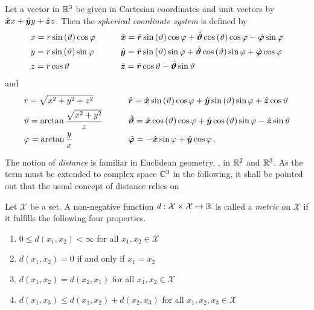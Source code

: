 \begin{definition}
	\label{def:sph_coords}
	Let a vector in $\mathbb{R}^3$ be given in Cartesian coordinates and unit vectors
	by $\uv{x}x + \uv{y}y + \uv{z}z$.
	Then the \emph{spherical coordinate system} is defined by 
	\begin{subequations}
		\begin{align}
			&x = r \sin \left(\vartheta\right) \cos \varphi
			\qquad
			&&\uv{x} = \uv{r} \sin\left(\vartheta\right) \cos \varphi +
			\uv{\vartheta} \cos\left(\vartheta\right) \cos \varphi -
			\uv{\varphi} \sin \varphi \\
			&y = r \sin \left(\vartheta\right) \sin \varphi
			\qquad
			&&\uv{y} = \uv{r} \sin\left(\vartheta\right) \sin \varphi +
			\uv{\vartheta} \cos\left(\vartheta\right) \sin \varphi +
			\uv{\varphi} \cos \varphi \\
			&z = r \cos \vartheta
			\qquad
			&&\uv{z} = \uv{r} \cos \vartheta - \uv{\vartheta} \sin \vartheta
		\end{align}
	\end{subequations}
	and
	\begin{subequations}
		\begin{align}
			&r = \sqrt{x^2 + y^2 + z^2}
			\qquad
			&&\uv{r} =
			\uv{x} \sin \left(\vartheta\right) \cos \varphi +
			\uv{y} \sin \left(\vartheta\right) \sin \varphi +
			\uv{z} \cos \vartheta \\
			&\vartheta = \arctan \frac{\sqrt{x^2 + y^2}}{z}
			\qquad
			&&\uv{\vartheta} = 
			\uv{x} \cos \left(\vartheta\right) \cos \varphi +
			\uv{y} \cos \left(\vartheta\right) \sin \varphi -
			\uv{z} \sin \vartheta \\
			&\varphi = \arctan \frac{y}{x}
			\qquad
			&&\uv{\varphi} = 
			-\uv{x} \sin \varphi +
			\uv{y} \cos \varphi \, .
		\end{align}
	\end{subequations}
\end{definition}

The notion of \emph{distance} is familiar in Euclidean geometry,
\ie, in $\mathbb{R}^2$ and
$\mathbb{R}^3$.
As the term must be extended to complex space $\mathbb{C}^3$ in the following, it shall
be pointed out that the usual concept of distance relies on
\begin{definition}[Metric]\label{def:metric}
	Let $\mathcal{X}$ be a set. A non-negative function
	$d: \mathcal{X} \times \mathcal{X} \mapsto \mathbb{R}$ is called a \emph{metric}
	on $\mathcal{X}$ if it fulfills the following four properties.
	\begin{enumerate}[label=(\alph*)]
		\item $0 \le d\left(x_1, x_2\right) < \infty$ for all
		$x_1, x_2 \in \mathcal{X}$
		\item $d\left(x_1, x_2\right) = 0$ if and only if $x_1 = x_2$
		\item $d\left(x_1, x_2\right) = d\left(x_2, x_1\right)$ for all
		$x_1, x_2 \in \mathcal{X}$
		\item $d\left(x_1, x_3\right) \le d\left(x_1, x_2\right) + d\left(x_2, x_3\right)$
		for all $x_1, x_2, x_3 \in \mathcal{X}$
	\end{enumerate}
\end{definition}

